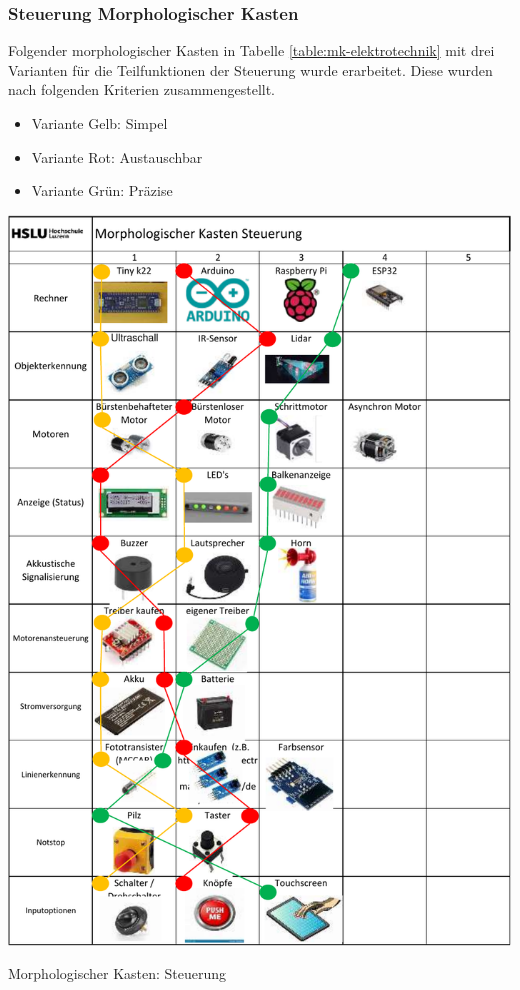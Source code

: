 \subsubsection*{Steuerung Morphologischer Kasten}


Folgender morphologischer Kasten in Tabelle \ref{table:mk-elektrotechnik} mit drei Varianten für die Teilfunktionen der Steuerung wurde erarbeitet. Diese wurden nach folgenden Kriterien zusammengestellt.

\begin{itemize}
    \item Variante Gelb: Simpel
    \item Variante Rot: Austauschbar
    \item Variante Grün: Präzise
\end{itemize}


\begin{table}[H]
\centering
\includegraphics[width=\textwidth -5mm]{assets/MK_Elektrotechnik.pdf}
\caption{Morphologischer Kasten: Steuerung}
\label{table:mk-elektrotechnik}
\end{table}

